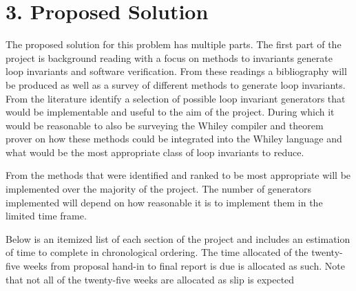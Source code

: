 \documentclass[11pt, a4paper, twoside, openright]{report}
\begin{document}
\section*{3. Proposed Solution}


%

The proposed solution for this problem has multiple parts.
The first part of the project is background reading with a focus on
methods to invariants generate loop invariants and software
verification. From these readings a bibliography will be produced
as well as a survey of different methods to generate loop invariants.
From the literature identify a selection of possible loop invariant
generators that would be implementable and useful to the aim of the project.
During which it would be reasonable to also be surveying the Whiley
compiler and theorem prover on how these methods could be integrated into the Whiley language
and what would be the most appropriate class of loop invariants to reduce.

From the methods that were identified and ranked to be most appropriate
will be implemented over the majority of the project.
The number of generators implemented will depend on how reasonable
it is to implement them in the limited time frame.


Below is an itemized list of each section of the project and includes an
estimation of time to complete in chronological ordering.
The time allocated of the twenty-five weeks from proposal hand-in to
final report is due is allocated as such. Note that not all of the
twenty-five weeks are allocated as slip is expected
\end{document}
